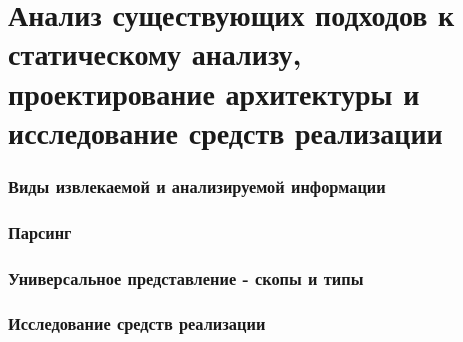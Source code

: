\section{Анализ существующих подходов к статическому анализу, проектирование архитектуры и
исследование средств реализации}

\subsubsection{Виды извлекаемой и анализируемой информации}




\subsubsection{Парсинг}


\subsubsection{Универсальное представление - скопы и типы}


\subsubsection{Исследование средств реализации}



\clearpage